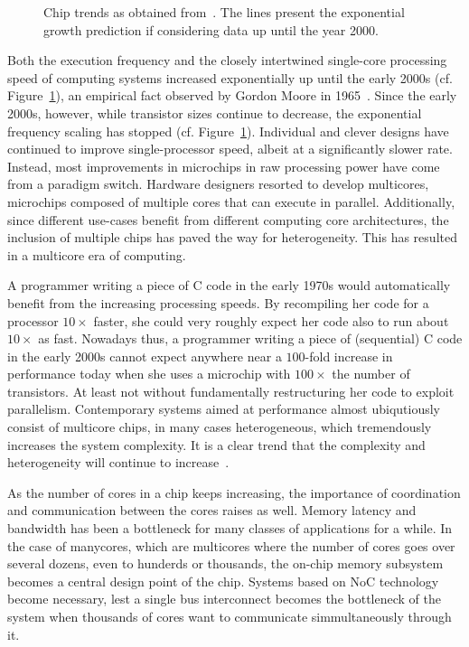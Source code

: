 \begin{figure}[h]
	\centering
   \resizebox{0.9\textwidth}{!}{}
   \caption{Chip trends as obtained from~\cite{microprocessordata}. The lines present the exponential growth prediction if considering data up until the year 2000.}
	\label{fig:multicore_era}
\end{figure}


Both the execution frequency and the closely intertwined single-core processing speed of computing systems increased exponentially up until the early 2000s (cf. Figure~\ref{fig:multicore_era}), an empirical fact observed by Gordon Moore in 1965~\cite{moore}.
Since the early 2000s, however, while transistor sizes continue to decrease, the exponential frequency scaling has stopped (cf. Figure~\ref{fig:multicore_era}).
Individual and clever designs have continued to improve single-processor speed, albeit at a significantly slower rate.
Instead, most improvements in microchips in raw processing power have come from a paradigm switch.
Hardware designers resorted to develop multicores, microchips composed of multiple cores that can execute in parallel.
Additionally, since different use-cases benefit from different computing core architectures, the inclusion of multiple chips has paved the way for heterogeneity.
This has resulted in a multicore era of computing.

A programmer writing a piece of C code in the early 1970s would automatically benefit from the increasing processing speeds.
By recompiling her code for a processor $10 \times$ faster, she could very roughly expect her code also to run about $10 \times$ as fast.%
Nowadays thus, a programmer writing a piece of (sequential) C code in the early 2000s cannot expect anywhere near a $100$-fold increase in performance today when she uses a microchip with $100 \times$ the number of transistors.
At least not without fundamentally restructuring her code to exploit parallelism.
Contemporary systems aimed at performance almost ubiqutiously consist of multicore chips, in many cases heterogeneous, which tremendously increases the system complexity.
It is a clear trend that the complexity and heterogeneity will continue to increase~\cite{voelp16_pmes}.

As the number of cores in a chip keeps increasing, the importance of coordination and communication between the cores raises as well.
Memory latency and bandwidth has been a bottleneck for many classes of applications for a while.
In the case of manycores, which are multicores where the number of cores goes over several dozens, even to hunderds or thousands, the on-chip memory subsystem becomes a central design point of the chip.
Systems based on \ac{NoC} technology become necessary, lest a single bus interconnect becomes the bottleneck of the system when thousands of cores want to communicate simmultaneously through it.


